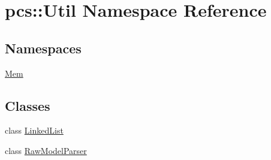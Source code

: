 \hypertarget{namespacepcs_1_1Util}{}\section{pcs\+:\+:Util Namespace Reference}
\label{namespacepcs_1_1Util}
\subsection*{Namespaces}
\begin{DoxyCompactItemize}
\item 
 \hyperlink{namespacepcs_1_1Util_1_1Mem}{Mem}
\end{DoxyCompactItemize}
\subsection*{Classes}
\begin{DoxyCompactItemize}
\item 
class \hyperlink{classpcs_1_1Util_1_1LinkedList}{Linked\+List}
\item 
class \hyperlink{classpcs_1_1Util_1_1RawModelParser}{Raw\+Model\+Parser}
\end{DoxyCompactItemize}
